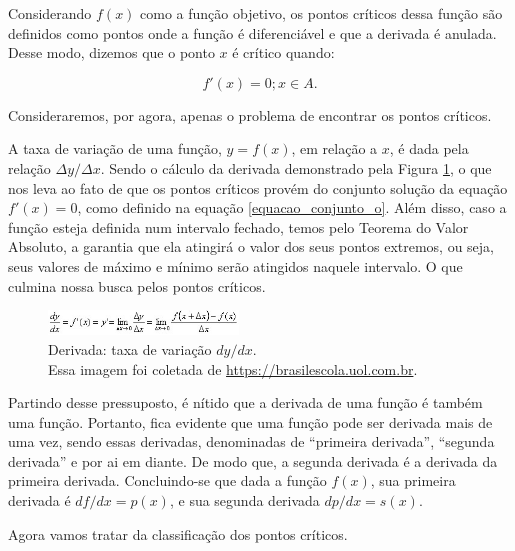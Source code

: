\begin{definition}
    Considerando $f(x)$ como a função objetivo, os pontos críticos dessa função
    são definidos como pontos onde a função é diferenciável e que a derivada é
    anulada. Desse modo, dizemos que o ponto $x$ é crítico quando:

    \begin{equation}
        f'(x) = 0; x \in A.
    \end{equation}

\end{definition}


Consideraremos, por agora, apenas o problema de encontrar os pontos críticos.

A taxa de variação de uma função, \(y=f(x)\), em relação a \(x\), é dada pela
relação \(\Delta y / \Delta x\). Sendo o cálculo da derivada
demonstrado pela Figura \ref{derivada_padrao}, o que nos leva ao fato de que
os pontos críticos provém do conjunto solução da equação \(f'(x) = 0\), como
definido na equação \ref{equacao_conjunto_o}. Além disso, caso a função esteja
definida num intervalo fechado, temos pelo Teorema do Valor Absoluto, a
garantia que ela atingirá o valor dos seus pontos extremos, ou seja, seus
valores de máximo e mínimo serão atingidos naquele intervalo. O que culmina
nossa busca pelos pontos críticos.

\begin{figure}[h]
    \centering
    \includegraphics[width=0.45\textwidth]{src/derivada_padrao.jpg}
    \captionsetup{justification=centering}
    \caption{
        Derivada: taxa de variação \(dy/dx\).\\
        \tiny Essa imagem foi coletada de \url{https://brasilescola.uol.com.br}.
    }
    \label{derivada_padrao}
\end{figure}

Partindo desse pressuposto, é nítido que a derivada de uma função é também uma
função. Portanto, fica evidente que uma função pode ser derivada
mais de uma vez, sendo essas derivadas, denominadas de ``primeira derivada'',
``segunda derivada'' e por ai em diante. De modo que, a segunda derivada é
a derivada da primeira derivada. Concluindo-se que dada a função
\(f(x)\), sua primeira derivada é \(df/dx = p(x)\), e sua segunda derivada
\(dp/dx = s(x)\).

Agora vamos tratar da classificação dos pontos críticos.

